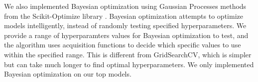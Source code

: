 \documentclass[twocolumn, nofootinbib, secnumarabic, amssymb, nobibnotes, aps, prd]{revtex4-2}
\begin{document}
We also implemented Bayesian optimization using Gaussian Processes methods from the Scikit-Optimize library \cite{head_tim_2021_5565057}. Bayesian optimization attempts to optimize models intelligently, instead of randomly testing specified hyperparameters. We provide a range of hyperparamters values for Bayesian optimization to test, and the algorithm uses acquisition functions to decide which specific values to use within the specified range. This is different from GridSearchCV, which is simpler but can take much longer to find optimal hyperparameters. We only implemented Bayesian optimization on our top models.

\begin{table}[!h]
   \centering
\end{table}
\end{document}
